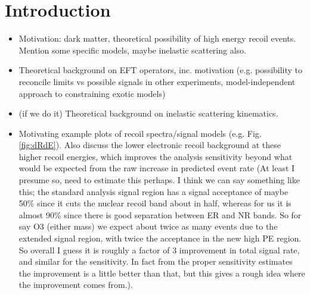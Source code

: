 \section{Introduction}
\begin{itemize}
  \item Motivation: dark matter, theoretical possibility of high energy recoil events. Mention some specific models, maybe inelastic scattering also.
  \item Theoretical background on EFT operators, inc. motivation (e.g. possibility to reconcile limits vs possible signals in other experiments, model-independent approach to constraining exotic models)
  \item (if we do it) Theoretical background on inelastic scattering kinematics.
  \item Motivating example plots of recoil spectra/signal models (e.g. Fig. \ref{fig:dRdE}). Also discuss the lower electronic recoil background at these higher recoil energies, which improves the analysis sensitivity beyond what would be expected from the raw increase in predicted event rate (At least I presume so, need to estimate this perhaps. I think we can say something like this; the standard analysis signal region has a signal acceptance of maybe 50\% since it cuts the nuclear recoil band about in half, whereas for us it is almost 90\% since there is good separation between ER and NR bands. So for say O3 (either mass) we expect about twice as many events due to the extended signal region, with twice the acceptance in the new high PE region. So overall I guess it is roughly a factor of 3 improvement in total signal rate, and similar for the sensitivity. In fact from the proper sensitivity estimates the improvement is a little better than that, but this gives a rough idea where the improvement comes from.).


\end{itemize}
